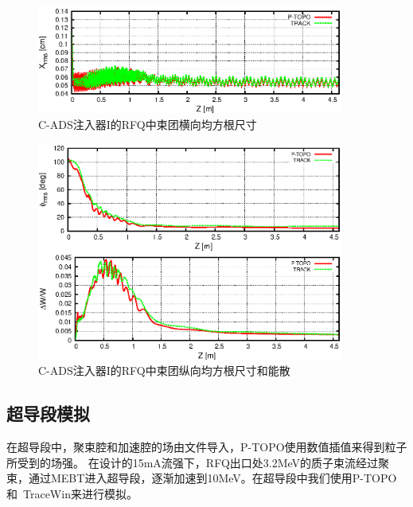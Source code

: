 \begin{figure}[!htb]
    \centering
    \includegraphics[width=0.9\textwidth]{Img/ADS_RFQ_size1.eps}
    \caption{C-ADS注入器I的RFQ中束团横向均方根尺寸}
    \label{fig:ADS_RFQ_size1}
\end{figure}

\begin{figure}[!htb]
    \centering
    \includegraphics[width=0.9\textwidth]{Img/ADS_RFQ_size2.eps}
    \caption{C-ADS注入器I的RFQ中束团纵向均方根尺寸和能散}
    \label{fig:ADS_RFQ_size2}
\end{figure}

\subsection{超导段模拟}
在超导段中，聚束腔和加速腔的场由文件导入，P-TOPO使用数值插值来得到粒子所受到的场强。
在设计的15mA流强下，RFQ出口处3.2MeV的质子束流经过聚束，通过MEBT进入超导段，逐渐加速到10MeV。在超导段中我们使用P-TOPO和~TraceWin来进行模拟。

